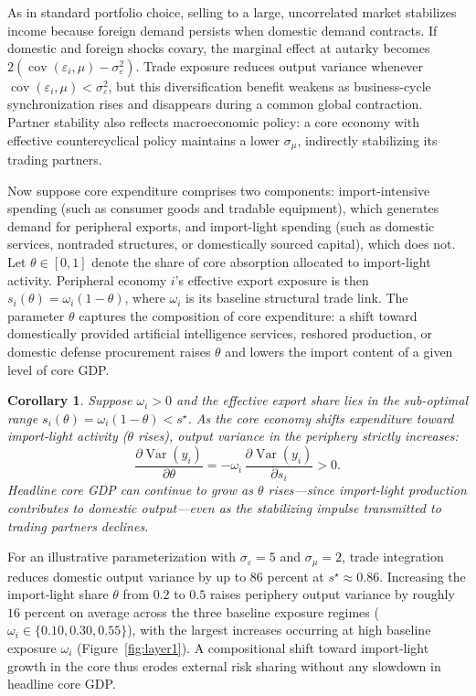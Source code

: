 \documentclass[12pt, a4paper]{article}
\newtheorem{corollary}{Corollary}
\begin{document}
As in standard portfolio choice, selling to a large, uncorrelated market stabilizes income because foreign demand persists when domestic demand contracts. If domestic and foreign shocks covary, the marginal effect at autarky becomes $2(\operatorname{cov}(\varepsilon_i,\mu)-\sigma_\varepsilon^2)$. Trade exposure reduces output variance whenever $\operatorname{cov}(\varepsilon_i,\mu) < \sigma_\varepsilon^2$, but this diversification benefit weakens as business-cycle synchronization rises and disappears during a common global contraction. Partner stability also reflects macroeconomic policy: a core economy with effective countercyclical policy maintains a lower $\sigma_\mu$, indirectly stabilizing its trading partners.

Now suppose core expenditure comprises two components: import-intensive spending (such as consumer goods and tradable equipment), which generates demand for peripheral exports, and import-light spending (such as domestic services, nontraded structures, or domestically sourced capital), which does not. Let $\theta \in [0,1]$ denote the share of core absorption allocated to import-light activity. Peripheral economy $i$'s effective export exposure is then $s_i(\theta) = \omega_i(1-\theta)$, where $\omega_i$ is its baseline structural trade link. The parameter $\theta$ captures the composition of core expenditure: a shift toward domestically provided artificial intelligence services, reshored production, or domestic defense procurement raises $\theta$ and lowers the import content of a given level of core GDP.

\begin{corollary}\label{prop:tilt}
Suppose $\omega_i > 0$ and the effective export share lies in the sub-optimal range $s_i(\theta) = \omega_i(1-\theta) < s^\star$. As the core economy shifts expenditure toward import-light activity ($\theta$ rises), output variance in the periphery strictly increases:
\[
\frac{\partial\operatorname{Var}(y_i)}{\partial\theta} = -\omega_i\,\frac{\partial\operatorname{Var}(y_i)}{\partial s_i} > 0.
\]
Headline core GDP can continue to grow as $\theta$ rises---since import-light production contributes to domestic output---even as the stabilizing impulse transmitted to trading partners declines.
\end{corollary}

For an illustrative parameterization with $\sigma_\varepsilon=5$ and $\sigma_\mu=2$, trade integration reduces domestic output variance by up to $86$ percent at $s^\star \approx 0.86$. Increasing the import-light share $\theta$ from $0.2$ to $0.5$ raises periphery output variance by roughly $16$ percent on average across the three baseline exposure regimes ($\omega_i \in \{0.10, 0.30, 0.55\}$), with the largest increases occurring at high baseline exposure $\omega_i$ (Figure~\ref{fig:layer1}). A compositional shift toward import-light growth in the core thus erodes external risk sharing without any slowdown in headline core GDP.
\end{document}
